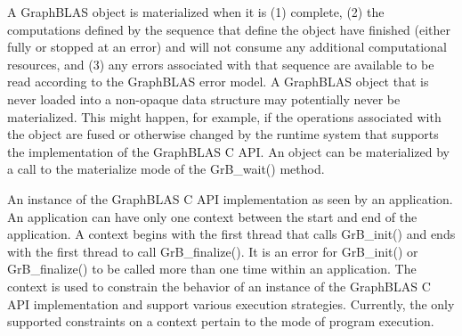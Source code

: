 

 A GraphBLAS object is materialized when it is (1) complete, (2) the computations 
defined by the sequence that define the object have finished (either fully or stopped at an error) and will not consume any 
additional computational resources, and (3) any errors associated with that sequence are available to be read according to the 
GraphBLAS error model.  A GraphBLAS object that is never loaded into a non-opaque data structure may 
potentially never be materialized.  This might happen, for example, if the operations 
associated with the object are fused or otherwise changed by the runtime system 
that supports the implementation of the GraphBLAS C API.   An object can be materialized by a call
to the materialize mode of the {\sf GrB\_wait()} method. 

  An instance of the GraphBLAS C API implementation
as seen by an application.  An application can have only one context between the 
start and end of the application.  
A context begins with the first thread that calls {\sf GrB\_init()} and ends with the 
first thread to call {\sf GrB\_finalize()}.  
It is an error for {\sf GrB\_init()} or {\sf GrB\_finalize()} to be called more than one
time within an application.  The context is used to constrain the behavior of an
instance of the GraphBLAS C API implementation and support various execution strategies.
Currently, the only
supported constraints on a context pertain to the mode of program execution.

